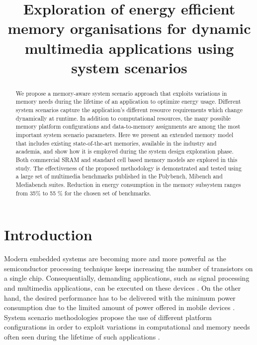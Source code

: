 \documentclass[a4paper,conference]{IEEEtran}
\begin{document}
\title{Exploration of energy efficient memory organisations for dynamic multimedia applications using system scenarios}
\author{
}

\maketitle

\begin{abstract}
We propose a memory-aware system scenario approach that exploits variations in memory needs during the lifetime of an application to optimize energy usage. Different system scenarios capture the application's different resource requirements which change dynamically at runtime. In addition to computational resources, the many possible memory platform configurations and data-to-memory assignments are among the most important system scenario parameters. Here we present an extended memory model that includes existing state-of-the-art memories, available in the industry and academia, and show how it is employed during the system design exploration phase. Both commercial SRAM and standard cell based memory models are explored in this study. The effectiveness of the proposed methodology is demonstrated and tested using a large set of multimedia benchmarks published in the Polybench, Mibench and Mediabench suites. Reduction in energy consumption in the memory subsystem ranges from 35\% to 55 \% for the chosen set of benchmarks.
\end{abstract}
\IEEEpeerreviewmaketitle

\section{Introduction}
\label{sec:introduction}

Modern embedded systems are becoming more and more powerful as the semiconductor processing technique keeps increasing the number of transistors on a single chip. Consequentially, demanding applications, such as signal processing and multimedia applications, can be executed on these devices \cite{narasinga}. On the other hand, the desired performance has to be delivered with the minimum power consumption due to the limited amount of power offered in mobile devices \cite{tcm}. System scenario methodologies propose the use of different platform configurations in order to exploit variations in computational and memory needs often seen during the lifetime of such applications \cite{tcm}. 
\end{document}
